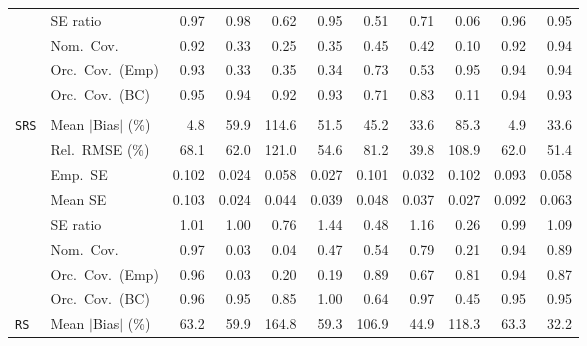 \begin{landscape}
\begin{longtable}{llrrrrrrrrr}
 & SE ratio & \cellcolor{ranktwo}0.97 & \cellcolor{rankone}0.98 & 0.62 & 0.95 & 0.51 & 0.71 & 0.06 & \cellcolor{rankthree}0.96 & 0.95 \\
 & Nom.\ Cov. & \cellcolor{ranktwo}0.92 & 0.33 & 0.25 & 0.35 & \cellcolor{rankthree}0.45 & 0.42 & 0.10 & \cellcolor{ranktwo}0.92 & \cellcolor{rankone}0.94 \\
 & Orc.\ Cov.\ (Emp) & \cellcolor{rankthree}0.93 & 0.33 & 0.35 & 0.34 & 0.73 & 0.53 & \cellcolor{rankone}0.95 & \cellcolor{ranktwo}0.94 & \cellcolor{ranktwo}0.94 \\
 & Orc.\ Cov.\ (BC) & \cellcolor{rankone}0.95 & \cellcolor{ranktwo}0.94 & 0.92 & \cellcolor{rankthree}0.93 & 0.71 & 0.83 & 0.11 & \cellcolor{ranktwo}0.94 & \cellcolor{rankthree}0.93 \\
\addlinespace[2pt]
\multicolumn{11}{l}{\textbf{Interaction}} \\
\addlinespace[2pt]
\quad \texttt{SRS} & Mean $|$Bias$|$ (\%) & \cellcolor{rankone}4.8 & 59.9 & 114.6 & 51.5 & 45.2 & \cellcolor{rankthree}33.6 & 85.3 & \cellcolor{ranktwo}4.9 & \cellcolor{rankthree}33.6 \\
 & Rel.\ RMSE (\%) & 68.1 & 62.0 & 121.0 & \cellcolor{rankthree}54.6 & 81.2 & \cellcolor{rankone}39.8 & 108.9 & 62.0 & \cellcolor{ranktwo}51.4 \\
 & Emp.\ SE & 0.102 & 0.024 & 0.058 & 0.027 & 0.101 & 0.032 & 0.102 & 0.093 & 0.058 \\
 & Mean SE & 0.103 & 0.024 & 0.044 & 0.039 & 0.048 & 0.037 & 0.027 & 0.092 & 0.063 \\
 & SE ratio & \cellcolor{ranktwo}1.01 & \cellcolor{rankone}1.00 & 0.76 & 1.44 & 0.48 & 1.16 & 0.26 & \cellcolor{ranktwo}0.99 & \cellcolor{rankthree}1.09 \\
 & Nom.\ Cov. & \cellcolor{ranktwo}0.97 & 0.03 & 0.04 & 0.47 & 0.54 & 0.79 & 0.21 & \cellcolor{rankone}0.94 & \cellcolor{rankthree}0.89 \\
 & Orc.\ Cov.\ (Emp) & \cellcolor{rankone}0.96 & 0.03 & 0.20 & 0.19 & \cellcolor{ranktwo}0.89 & 0.67 & 0.81 & \cellcolor{rankone}0.94 & \cellcolor{rankthree}0.87 \\
 & Orc.\ Cov.\ (BC) & \cellcolor{ranktwo}0.96 & \cellcolor{rankone}0.95 & 0.85 & 1.00 & 0.64 & \cellcolor{rankthree}0.97 & 0.45 & \cellcolor{rankone}0.95 & \cellcolor{rankone}0.95 \\
\addlinespace[2pt]
\quad \texttt{RS} & Mean $|$Bias$|$ (\%) & 63.2 & 59.9 & 164.8 & \cellcolor{rankthree}59.3 & 106.9 & \cellcolor{ranktwo}44.9 & 118.3 & 63.3 & \cellcolor{rankone}32.2 \\

\end{longtable}
\end{landscape}

